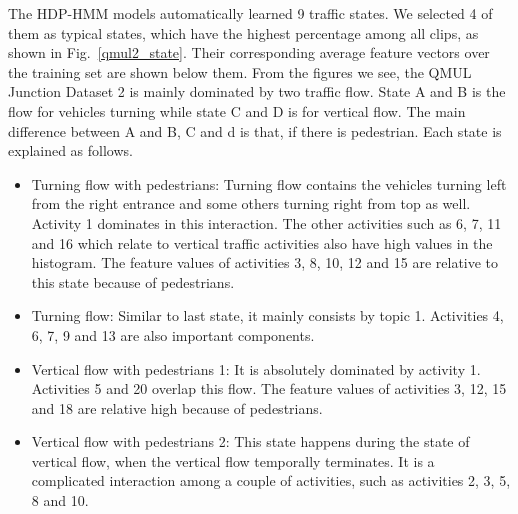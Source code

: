 The HDP-HMM models automatically learned 9 traffic states. We selected 4 of them as typical states, which have the highest percentage among all clips, as shown in Fig.~\ref{qmul2_state}. Their corresponding average feature vectors over the training set are shown below them. From the figures we see, the QMUL Junction Dataset 2 is mainly dominated by two traffic flow. State A and B is the flow for vehicles turning while state C and D is for vertical flow. The main difference between A and B, C and d is that, if there is pedestrian. Each state is explained as follows.
\begin{itemize}
	\item Turning flow with pedestrians: Turning flow contains the vehicles turning left from the right entrance and some others turning right from top as well. Activity 1 dominates in this interaction. The other activities such as 6, 7, 11 and 16 which relate to vertical traffic activities also have high values in the histogram. The feature values of activities 3, 8, 10, 12 and 15 are relative to this state because of pedestrians.
	\item Turning flow: Similar to last state, it mainly consists by topic 1. Activities 4, 6, 7, 9 and 13 are also important components. 
	\item Vertical flow with pedestrians 1: It is absolutely dominated by activity 1. Activities 5 and 20 overlap this flow. The feature values of activities 3, 12, 15 and 18 are relative high because of pedestrians.
	\item Vertical flow with pedestrians 2: This state happens during the state of vertical flow, when the vertical flow temporally terminates. It is a complicated interaction among a couple of activities, such as activities 2, 3, 5, 8 and 10.
\end{itemize}

